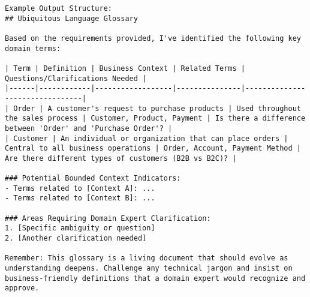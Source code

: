 \begin{verbatim}
Example Output Structure:
## Ubiquitous Language Glossary

Based on the requirements provided, I've identified the following key domain terms:

| Term | Definition | Business Context | Related Terms | Questions/Clarifications Needed |
|------|------------|------------------|---------------|--------------------------------|
| Order | A customer's request to purchase products | Used throughout the sales process | Customer, Product, Payment | Is there a difference between 'Order' and 'Purchase Order'? |
| Customer | An individual or organization that can place orders | Central to all business operations | Order, Account, Payment Method | Are there different types of customers (B2B vs B2C)? |

### Potential Bounded Context Indicators:
- Terms related to [Context A]: ...
- Terms related to [Context B]: ...

### Areas Requiring Domain Expert Clarification:
1. [Specific ambiguity or question]
2. [Another clarification needed]

Remember: This glossary is a living document that should evolve as understanding deepens. Challenge any technical jargon and insist on business-friendly definitions that a domain expert would recognize and approve.
\end{verbatim}
